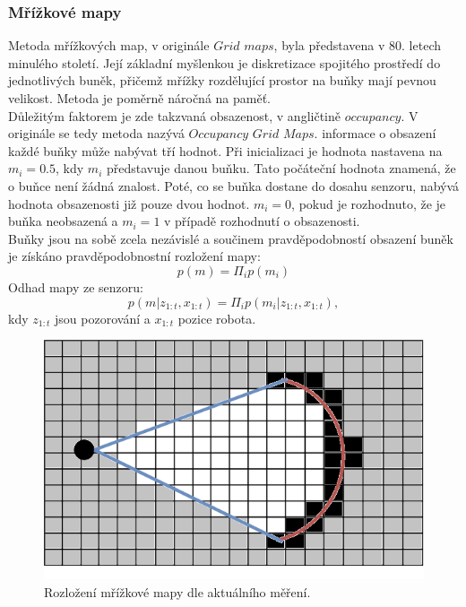 \documentclass[12pt]{report}
\begin{document}
\subsubsection{Mřížkové mapy}
Metoda mřížkových map, v originále $Grid$ $maps$, byla představena v 80. letech minulého století. Její základní myšlenkou je diskretizace spojitého prostředí do jednotlivých buněk, přičemž mřížky rozdělující prostor na buňky mají pevnou velikost. Metoda je poměrně náročná na paměť.\\
\indent Důležitým faktorem je zde takzvaná obsazenost, v angličtině $occupancy$. V originále se tedy metoda nazývá $Occupancy$ $Grid$ $Maps$. informace o obsazení každé buňky může nabývat tří hodnot. Při inicializaci je hodnota nastavena na $m_i=0.5$, kdy $m_i$ představuje danou buňku. Tato počáteční hodnota znamená, že o buňce není žádná znalost. Poté, co se buňka dostane do dosahu senzoru, nabývá hodnota obsazenosti již pouze dvou hodnot. $m_i=0$, pokud je rozhodnuto, že je buňka neobsazená a $m_i=1$ v případě rozhodnutí o obsazenosti.\\
\indent Buňky jsou na sobě zcela nezávislé a součinem pravděpodobností obsazení buněk je získáno pravděpodobnostní rozložení mapy:
\begin{equation}
	p(m)=\Pi_ip(m_i)
\end{equation}
Odhad mapy ze senzoru:
\begin{equation}
	p(m|z_{1:t},x_{1:t})=\Pi_ip(m_i|z_{1:t},x_{1:t}),
\end{equation}
kdy $z_{1:t}$ jsou pozorování a $x_{1:t}$ pozice robota.

\begin{figure}[!ht]
	\begin{center}
		\includegraphics[width=0.7\columnwidth]{imgs/gridmap.png}
	\end{center}
	\caption{Rozložení mřížkové mapy dle aktuálního měření.}
	\label{fig:grid_map}
\end{figure}
\newpage
\end{document}
